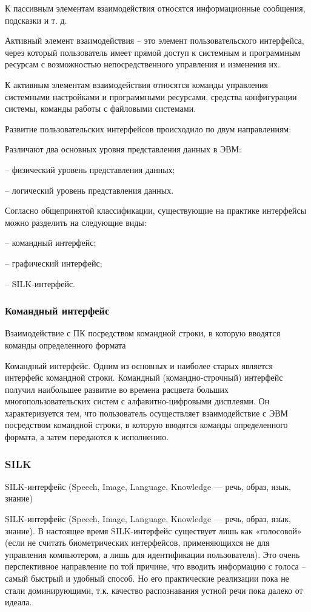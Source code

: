 \documentclass{../industrial-development}
\begin{document}
К пассивным элементам взаимодействия относятся информационные сообщения, подсказки и т. д.

Активный элемент взаимодействия – это элемент пользовательского интерфейса, через который пользователь имеет прямой доступ к системным и программным ресурсам с возможностью непосредственного управления и изменения их.

К активным элементам взаимодействия относятся команды управления системными настройками и программными ресурсами, средства конфигурации системы, команды работы с файловыми системами.

Развитие пользовательских интерфейсов происходило по двум направлениям:

Различают два основных уровня представления данных в ЭВМ:

– физический уровень представления данных;

– логический уровень представления данных.

Согласно общепринятой классификации, существующие на практике интерфейсы можно разделить на следующие виды:

– командный интерфейс;

– графический интерфейс;

– SILK-интерфейс.

\begin{frame} \frametitle{Командный интерфейс}
 Взаимодействие с ПК посредством \alert{командной строки}, в которую вводятся команды определенного формата
\end{frame}

\lecturenotes

Командный интерфейс. Одним из основных и наиболее старых является интерфейс командной строки. Командный (командно-строчный) интерфейс получил наибольшее развитие во времена расцвета больших многопользовательских систем с алфавитно-цифровыми дисплеями. Он характеризуется тем, что пользователь осуществляет взаимодействие с ЭВМ посредством командной строки, в которую вводятся команды определенного формата, а затем передаются к исполнению.

\begin{frame} \frametitle{SILK}
 \alert{SILK}-интерфейс (Speech, Image, Language, Knowledge — речь, образ, язык, знание)
\end{frame}

\lecturenotes

SILK-интерфейс (Speech, Image, Language, Knowledge — речь, образ, язык, знание). В настоящее время SILK-интерфейс существует лишь как «голосовой» (если не считать биометрических интерфейсов, применяющихся не для управления компьютером, а лишь для идентификации пользователя). Это очень перспективное направление по той причине, что вводить информацию с голоса – самый быстрый и удобный способ. Но его практические реализации пока не стали доминирующими, т.к. качество распознавания устной речи пока далеко от идеала.
\end{document}
